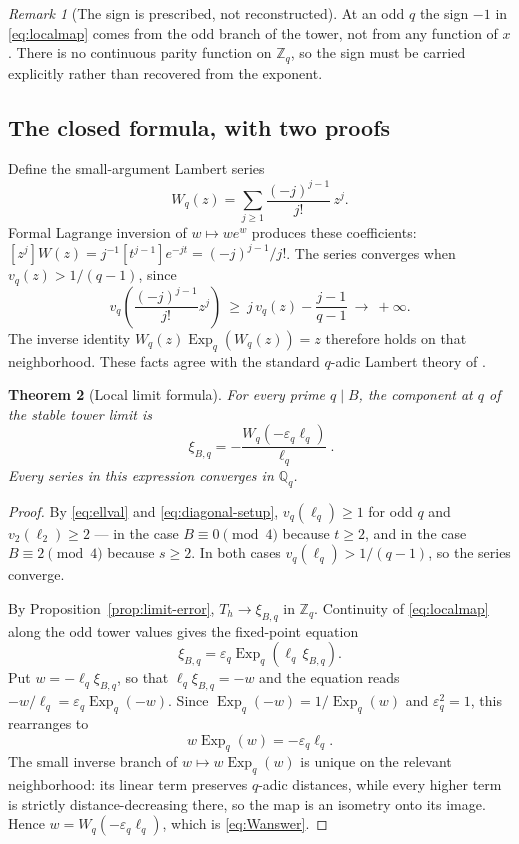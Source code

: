 \documentclass[11pt,letterpaper]{article}
\numberwithin{equation}{section}
\newtheorem{theorem}{Theorem}[section]
\theoremstyle{definition}
\theoremstyle{remark}
\newtheorem{remark}[theorem]{Remark}
\newcommand{\Z}{\mathbb Z}
\newcommand{\Q}{\mathbb Q}
\newcommand{\eps}{\varepsilon}
\DeclareMathOperator{\Expop}{Exp}
\begin{document}
\begin{remark}[The sign is prescribed, not reconstructed]
At an odd $q$ the sign $-1$ in \eqref{eq:localmap} comes from the odd branch of the tower, not from any function of $x$. There is no continuous parity function on $\Z_q$, so the sign must be carried explicitly rather than recovered from the exponent.
\end{remark}

\subsection{The closed formula, with two proofs}

Define the small-argument Lambert series
\begin{equation}\label{eq:Wseries}
 W_q(z)=\sum_{j\ge1}\frac{(-j)^{j-1}}{j!}\,z^j.
\end{equation}
Formal Lagrange inversion of $w\mapsto we^w$ produces these coefficients: $[z^j]W(z)=j^{-1}[t^{j-1}]e^{-jt}=(-j)^{j-1}/j!$. The series converges when $v_q(z)>1/(q-1)$, since
\[
 v_q\!\left(\frac{(-j)^{j-1}}{j!}z^j\right)\ \ge\ j\,v_q(z)-\frac{j-1}{q-1}\ \longrightarrow\ +\infty .
\]
The inverse identity $W_q(z)\Expop_q(W_q(z))=z$ therefore holds on that neighborhood. These facts agree with the standard $q$-adic Lambert theory of \cite{mezo}.

\begin{theorem}[Local limit formula]\label{thm:W}
For every prime $q\mid B$, the component at $q$ of the stable tower limit is
\begin{equation}\label{eq:Wanswer}
 \boxed{\ \xi_{B,q}=-\frac{W_q(-\eps_q\ell_q)}{\ell_q}\ }.
\end{equation}
Every series in this expression converges in $\Q_q$.
\end{theorem}
\begin{proof}
By \eqref{eq:ellval} and \eqref{eq:diagonal-setup}, $v_q(\ell_q)\ge1$ for odd $q$ and $v_2(\ell_2)\ge2$ --- in the case $B\equiv0\pmod4$ because $t\ge2$, and in the case $B\equiv2\pmod4$ because $s\ge2$. In both cases $v_q(\ell_q)>1/(q-1)$, so the series converge.

By Proposition~\ref{prop:limit-error}, $T_h\to\xi_{B,q}$ in $\Z_q$. Continuity of \eqref{eq:localmap} along the odd tower values gives the fixed-point equation
\[
 \xi_{B,q}=\eps_q\Expop_q(\ell_q\,\xi_{B,q}).
\]
Put $w=-\ell_q\xi_{B,q}$, so that $\ell_q\xi_{B,q}=-w$ and the equation reads $-w/\ell_q=\eps_q\Expop_q(-w)$. Since $\Expop_q(-w)=1/\Expop_q(w)$ and $\eps_q^2=1$, this rearranges to
\[
 w\Expop_q(w)=-\eps_q\ell_q .
\]
The small inverse branch of $w\mapsto w\Expop_q(w)$ is unique on the relevant neighborhood: its linear term preserves $q$-adic distances, while every higher term is strictly distance-decreasing there, so the map is an isometry onto its image. Hence $w=W_q(-\eps_q\ell_q)$, which is \eqref{eq:Wanswer}.
\end{proof}
\end{document}
